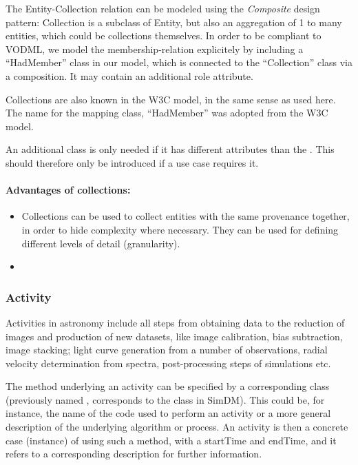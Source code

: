 
The Entity-Collection relation can be modeled using the \emph{Composite} design pattern: 
Collection is a subclass of Entity, but also an aggregation of 1 to many entities, 
which could be collections themselves. 
In order to be compliant to VODML, we model the membership-relation explicitely 
by including a ``HadMember'' class in our model, which is connected to the
``Collection'' class via a composition. It may contain an additional role attribute.

Collections are also known in the W3C model, in the same sense as used here. 
The name for the mapping class, ``HadMember'' was adopted from the W3C model.

An additional class  is only 
needed if it has different attributes than 
the . This should therefore only be introduced if a use case requires it.

\paragraph{Advantages of collections:}
\begin{itemize}
\item Collections can be used to collect entities with the same provenance together, 
    in order to hide complexity where necessary. They can be used for defining 
    different levels of detail (granularity).
\item {}
\end{itemize}





\subsubsection{Activity}
Activities in astronomy include all steps from obtaining data to the reduction of 
images and production of new datasets, like image calibration, bias subtraction, image stacking; 
light curve generation from a number of observations, radial velocity 
determination from spectra, post-processing steps of simulations etc.

The method underlying an activity can be specified by a corresponding 
 class (previously named , corresponds 
to the  class in SimDM). This could be, 
for instance, the name of the code used to perform an activity or a more general 
description of the underlying algorithm or process. An activity is then a 
concrete case (instance) of using such a method, with a startTime and endTime, 
and it refers to a corresponding description for further information.

